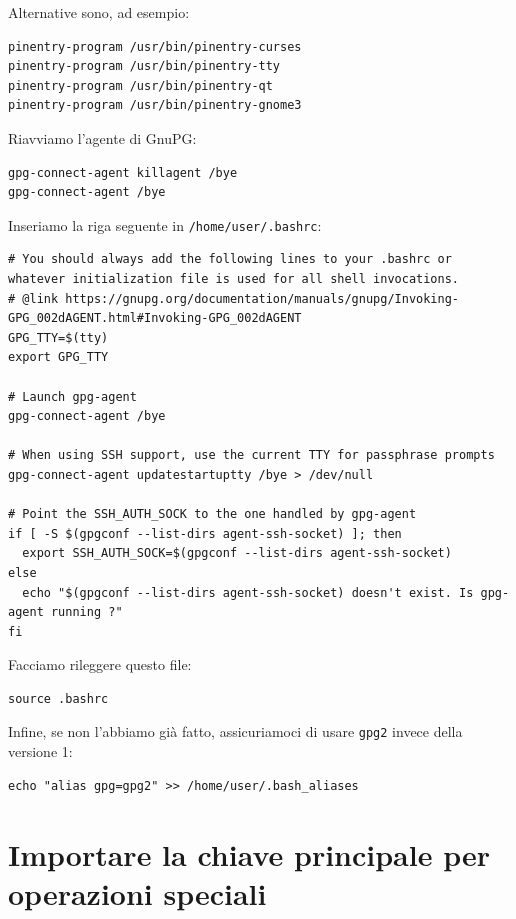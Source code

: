 \documentclass[a4paper,10pt]{article}
\begin{document}
Alternative sono, ad esempio:

\begin{lstlisting}
pinentry-program /usr/bin/pinentry-curses
pinentry-program /usr/bin/pinentry-tty
pinentry-program /usr/bin/pinentry-qt
pinentry-program /usr/bin/pinentry-gnome3
\end{lstlisting}

Riavviamo l'agente di GnuPG:

\begin{lstlisting}
gpg-connect-agent killagent /bye
gpg-connect-agent /bye
\end{lstlisting}

Inseriamo la riga seguente in \texttt{/home/user/.bashrc}:

\begin{lstlisting}
# You should always add the following lines to your .bashrc or whatever initialization file is used for all shell invocations.
# @link https://gnupg.org/documentation/manuals/gnupg/Invoking-GPG_002dAGENT.html#Invoking-GPG_002dAGENT
GPG_TTY=$(tty)
export GPG_TTY

# Launch gpg-agent
gpg-connect-agent /bye

# When using SSH support, use the current TTY for passphrase prompts
gpg-connect-agent updatestartuptty /bye > /dev/null

# Point the SSH_AUTH_SOCK to the one handled by gpg-agent
if [ -S $(gpgconf --list-dirs agent-ssh-socket) ]; then
  export SSH_AUTH_SOCK=$(gpgconf --list-dirs agent-ssh-socket)
else
  echo "$(gpgconf --list-dirs agent-ssh-socket) doesn't exist. Is gpg-agent running ?"
fi
\end{lstlisting}

Facciamo rileggere questo file:

\begin{lstlisting}
source .bashrc
\end{lstlisting}

Infine, se non l'abbiamo già fatto, assicuriamoci di usare \texttt{gpg2} invece della versione 1:

\begin{lstlisting}
echo "alias gpg=gpg2" >> /home/user/.bash_aliases
\end{lstlisting}

\section{Importare la chiave principale per operazioni speciali} \label{importare-chiave}
\end{document}
